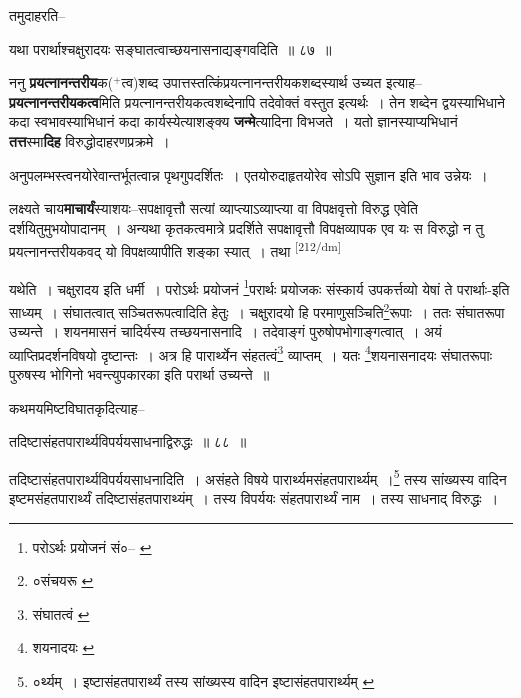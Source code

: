 \documentclass[article,12pt,a4paper]{memoir}
\newcommand{\add}[1]{($^{+}$#1)}
\begin{document}
	  \pstart तमुदाहरति--
	\pend
      

	  \pstart यथा परार्थाश्चक्षुरादयः सङ्घातत्वाच्छयनासनाद्यङ्गवदिति ॥ ८७ ॥
	\pend
      

	  \pstart ननु \textbf{प्रयत्नानन्तरीय}क\add{त्व}शब्द उपात्तस्तत्किंप्रयत्नानन्तरीयकशब्दस्यार्थ उच्यत इत्याह--\textbf{प्रयत्नानन्तरीयकत्व}मिति प्रयत्नानन्तरीयकत्वशब्देनापि तदेवोक्तं वस्तुत इत्यर्थः । तेन शब्देन द्वयस्याभिधाने कदा स्वभावस्याभिधानं कदा कार्यस्येत्याशङ्क्य \textbf{जन्मे}त्यादिना विभजते । यतो ज्ञानस्याप्यभिधानं \textbf{तत्त}स्मा\textbf{दिह} विरुद्धोदाहरणप्रक्रमे ।
	\pend
      

	  \pstart अनुपलम्भस्त्वनयोरेवान्तर्भूतत्वान्न पृथगुपदर्शितः । एतयोरुदाहृतयोरेव सोऽपि सुज्ञान इति भाव उन्नेयः ।
	\pend
      

	  \pstart लक्ष्यते चाय\textbf{माचार्यं}स्याशयः--सपक्षावृत्तौ सत्यां व्याप्त्याऽव्याप्त्या वा विपक्षवृत्तो विरुद्ध एवेति दर्शयितुमुभयोपादानम् । अन्यथा कृतकत्वमात्रे प्रदर्शिते सपक्षावृत्तौ विपक्षव्यापक एव यः स विरुद्धो न तु प्रयत्नानन्तरीयकवद् यो विपक्षव्यापीति शङ्का स्यात् । तथा  \leavevmode\textsuperscript{\rmlatinfont\tiny [212/dm]} 
	  
	यथेति । चक्षुरादय इति धर्मी । परोऽर्थः प्रयोजनं \footnote{परोऽर्थः प्रयोजनं सं०--\cite{dp-msA} \cite{dp-msB} \cite{dp-msC} \cite{dp-msD} \cite{dp-edP} \cite{dp-edH} \cite{dp-edE} \cite{dp-edN}}परार्थः प्रयोजकः संस्कार्य उपकर्त्तव्यो येषां ते परार्थाः-इति साध्यम् । संघातत्वात् सञ्चितरूपत्वादिति हेतुः । चक्षुरादयो हि परमाणुसञ्चिति\footnote{०संचयरू \cite{dp-msC} \cite{dp-msD}}रूपाः । ततः संघातरूपा उच्यन्ते । शयनमासनं चादिर्यस्य तच्छयनासनादि । तदेवाङ्गं पुरुषोपभोगाङ्गत्वात् । अयं व्याप्तिप्रदर्शनविषयो दृष्टान्तः । अत्र हि पारार्थ्येन संहतत्वं\footnote{संघातत्वं \cite{dp-msD}} व्याप्तम् । यतः \footnote{शयनादयः \cite{dp-msD}}शयनासनादयः संघातरूपाः पुरुषस्य भोगिनो भवन्त्युपकारका इति परार्था उच्यन्ते ॥ 
	  
	कथमयमिष्टविघातकृदित्याह-- 
	  
	तदिष्टासंहतपारार्थ्यविपर्ययसाधनाद्विरुद्धः ॥ ८८ ॥ 
	  
	तदिष्टासंहतपारार्थ्यविपर्ययसाधनादिति । असंहते विषये पारार्थ्यमसंहतपारार्थ्यम् ।\footnote{०र्थ्यम् । इष्टासंहतपारार्थ्यं तस्य सांख्यस्य वादिन इष्टासंहतपारार्थ्यम् \cite{dp-msC} \cite{dp-msD}} तस्य सांख्यस्य वादिन इष्टमसंहतपारार्थ्यं तदिष्टासंहतपाराथ्यंम् । तस्य विपर्ययः संहतपारार्थ्यं नाम । तस्य साधनाद् विरुद्धः । 
	  
\end{document}
